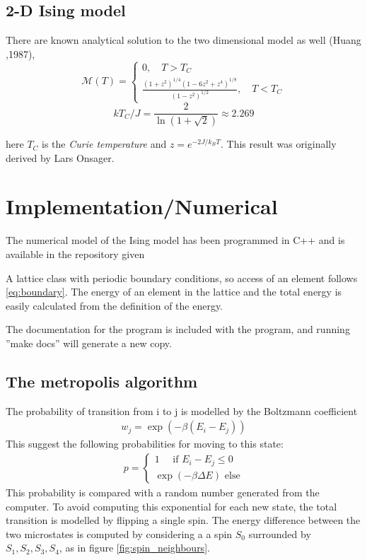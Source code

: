 \documentclass[11pt,a4paper,english,draft]{article}
\numberwithin{equation}{section}
\newcommand{\magM}{\mathcal{M}}
\begin{document}
\subsection{2-D Ising model}
There are known analytical solution to the two dimensional model as well (Huang ,1987),
\begin{equation}
\magM (T) = \begin{cases} 0, \quad T > T_C \\ \frac{(1+z^2)^{1/4} (1-6z^2 + z^4 )^{1/8} }{(1-z^2)^{1/2}}, \quad T < T_C \end{cases}
\end{equation}
\begin{equation}
k T_C/J = \frac{2}{\ln(1+ \sqrt{2}) } \approx 2.269
\end{equation}

here $T_C$ is the \emph{Curie temperature} and $z = e^{-2J/k_B T}$. This result was originally derived by Lars Onsager.

\section{Implementation/Numerical}

The numerical model of the Ising model has been programmed in C++ and is 
available in the repository given 

A lattice class with periodic boundary conditions, so access of an
element follows \eqref{eq:boundary}. The energy of an element in the 
lattice and the total energy is easily calculated from the definition
of the energy. 

The documentation for the program is included with the program, and 
running ''make docs'' will generate a new copy.

\subsection{The metropolis algorithm}

The probability of transition from i to j 
is modelled by the Boltzmann coefficient
\begin{gather}
w_j = \exp(-\beta (E_i - E_j))
\end{gather}
This suggest the following probabilities for moving to this state:
\begin{gather}
p = \begin{cases}
1 \quad\text{ if }  E_i - E_j \le 0\\
\exp(-\beta \Delta E) \text{ else}
\end{cases}
\label{eq:transition}
\end{gather}
This probability is compared with a random number generated from 
the computer. To avoid computing this exponential for each new state,
the total transition is modelled by flipping a single spin. The energy 
difference between the two microstates is computed by considering 
a a spin $S_0$ surrounded by $S_1,S_2,S_3, S_4$, as in figure 
\ref{fig:spin_neighbours}.
\end{document}
